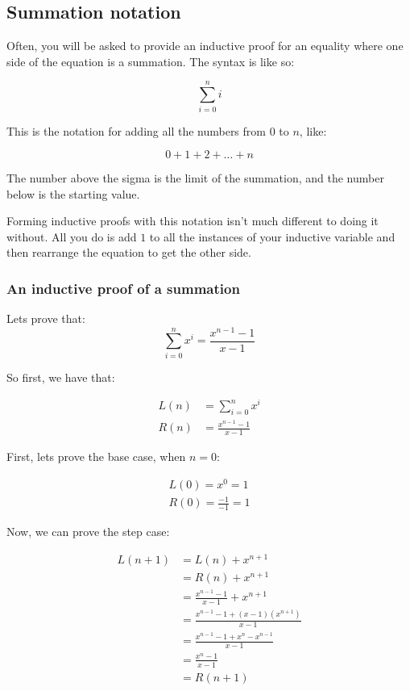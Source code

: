 \subsection*{Summation notation}

Often, you will be asked to provide an inductive proof for an equality where one
side of the equation is a summation. The syntax is like so:

\[
	\sum\limits^n_{i=0} i
\]

This is the notation for adding all the numbers from $0$ to $n$, like:

\[
	0 + 1 + 2 + \dots + n
\]

The number above the sigma is the limit of the summation, and the number below
is the starting value.

Forming inductive proofs with this notation isn't much different to doing it
without. All you do is add $1$ to all the instances of your inductive variable
and then rearrange the equation to get the other side.

\subsubsection*{An inductive proof of a summation}

Lets prove that:
\[
	\sum\limits^n_{i=0} x^i = \frac{x^{n-1} - 1}{x - 1}
\]

So first, we have that:

\[
	\begin{split}
		L(n) &= \sum\limits^n_{i=0} x^i\\
		R(n) &= \frac{x^{n-1} - 1}{x - 1}
	\end{split}
\]

First, lets prove the base case, when $n=0$:

\[
	\begin{split}
		L(0) = x^0 = 1\\
		R(0) = \frac{-1}{-1} = 1
	\end{split}
\]

Now, we can prove the step case:

\[
	\begin{split}
		L(n + 1) &= L(n) + x^{n+1}\\
				 &= R(n) + x^{n+1}\\
				 &= \frac{x^{n-1} - 1}{x - 1} + x^{n+1}\\
				 &= \frac{x^{n-1} - 1 + (x - 1)(x^{n+1})}{x - 1}\\
				 &= \frac{x^{n-1} - 1 + x^{n} - x^{n - 1}}{x - 1}\\
				 &= \frac{x^{n} - 1}{x - 1}\\
				 &= R(n+1)
	\end{split}
\]

